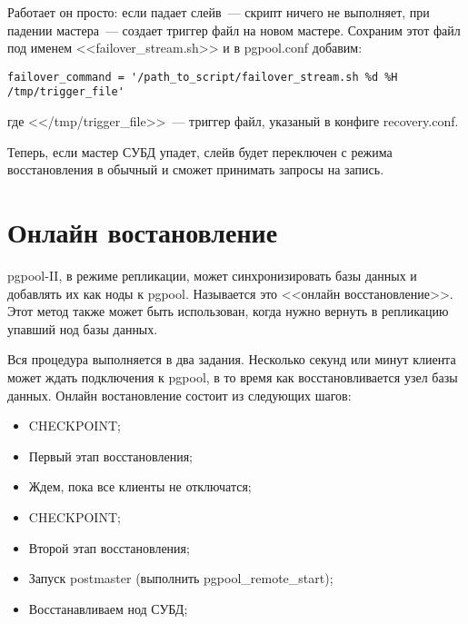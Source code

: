 Работает он просто: если падает слейв~--- скрипт ничего не выполняет, при падении мастера~--- 
создает триггер файл на новом мастере. Сохраним этот файл под именем <<failover\_stream.sh>> и 
в pgpool.conf добавим:
\begin{lstlisting}[label=lst:pgpool41,caption=Что выполнять при падении нода]
failover_command = '/path_to_script/failover_stream.sh %d %H /tmp/trigger_file'
\end{lstlisting}
где <</tmp/trigger\_file>>~--- триггер файл, указаный в конфиге recovery.conf.

Теперь, если мастер СУБД упадет, слейв будет переключен с режима восстановления в обычный и сможет принимать запросы на запись.

\section{Онлайн востановление}
pgpool-II, в режиме репликации, может синхронизировать базы данных и добавлять их как ноды к pgpool. 
Называется это <<онлайн восстановление>>. Этот метод также может быть использован, когда нужно вернуть 
в репликацию упавший нод базы данных.

Вся процедура выполняется в два задания. Несколько секунд или минут клиента может ждать подключения к pgpool, 
в то время как восстановливается узел базы данных. Онлайн востановление состоит из следующих шагов:
\begin{itemize}
\item CHECKPOINT;
\item Первый этап восстановления;
\item Ждем, пока все клиенты не отключатся;
\item CHECKPOINT;
\item Второй этап восстановления;
\item Запуск postmaster (выполнить pgpool\_remote\_start);
\item Восстанавливаем нод СУБД;
\end{itemize}

